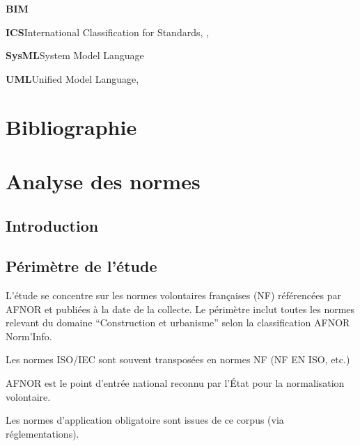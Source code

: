 \documentclass[a4paper,12pt]{article}
\begin{document}
\textbf{\hypertarget{gls-69}{BIM}}\hspace*{1em}\hspace*{.5em}\pageref{gls-1-use-1}

\textbf{\hypertarget{gls-186}{ICS}}\hspace*{1em}International Classification for Standards\hspace*{.5em}\pageref{gls-5-use-1}, \pageref{gls-5-use-2}, \pageref{gls-5-use-3}

\textbf{\hypertarget{gls-332}{SysML}}\hspace*{1em}System Model Language\hspace*{.5em}\pageref{gls-3-use-1}

\textbf{\hypertarget{gls-339}{UML}}\hspace*{1em}Unified Model Language\hspace*{.5em}\pageref{gls-2-use-1}, \pageref{gls-2-use-2}

\clearpage
\section{Bibliographie}
\label{sec:org8e74972}
\small
\printbibliography[heading=none]

\normalsize
\clearpage

\appendix
\section{Analyse des normes}
\label{sec:org3c4259b}
\subsection{Introduction}
\label{sec:orgad0dc9c}
\subsection{Périmètre de l'étude}
\label{sec:org43b3b8a}
L’étude se concentre sur les normes volontaires françaises (NF) référencées par AFNOR et publiées à la date de la collecte.
Le périmètre inclut toutes les normes relevant du domaine “Construction et urbanisme” selon la classification AFNOR Norm’Info.

Les normes ISO/IEC sont souvent transposées en normes NF (NF EN ISO, etc.)

AFNOR est le point d’entrée national reconnu par l’État pour la normalisation volontaire.

Les normes d’application obligatoire sont issues de ce corpus (via réglementations).
\end{document}
